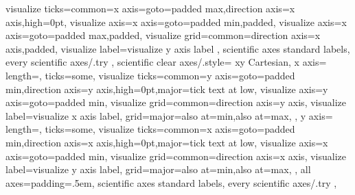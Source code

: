 {{{      visualize ticks={common={x axis={goto=padded max},direction axis=x axis,high=0pt}},
      visualize axis={x axis={goto=padded min},padded},
      visualize axis={x axis={goto=padded max},padded},
      visualize grid={common={direction axis=x axis,padded}},
      visualize label=visualize y axis label
    },
    scientific axes standard labels,
    every scientific axes/.try
  },
  scientific clear axes/.style={
    xy Cartesian,
    x axis={
      length=,
      ticks={some},
      visualize ticks={common={y axis={goto=padded min},direction axis=y axis,high=0pt},major={tick text at low}},
      visualize axis={y axis={goto=padded min}},
      visualize grid={common={direction axis=y axis}},
      visualize label=visualize x axis label,
      grid={major={also at=min,also at=max}},
    },
    y axis={
      length=,
      ticks={some},
      visualize ticks={common={x axis={goto=padded min},direction axis=x axis,high=0pt},major={tick text at low}},
      visualize axis={x axis={goto=padded min}},
      visualize grid={common={direction axis=x axis}},
      visualize label=visualize y axis label,
      grid={major={also at=min,also at=max}},
    },
    all axes={padding=.5em},
    scientific axes standard labels,
    every scientific axes/.try
  },
}




